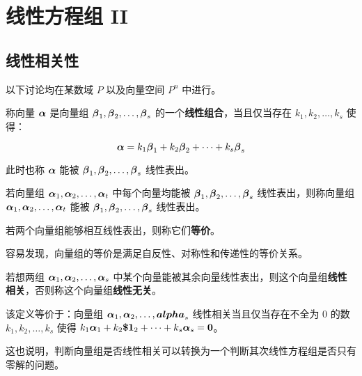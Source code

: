 \section{线性方程组 II}

\subsection{线性相关性}

以下讨论均在某数域 $P$ 以及向量空间	$P^n$ 中进行。

\begin{definition}
	称向量 $\boldsymbol{\alpha}$ 是向量组 $\boldsymbol{\beta}_1, \boldsymbol{\beta}_2, \dots, \boldsymbol{\beta}_s$ 的一个\textbf{线性组合}，当且仅当存在 $k_1, k_2, \dots, k_s$ 使得：

	$$
	\boldsymbol{\alpha} = k_1\boldsymbol{\beta}_1 + k_2\boldsymbol{\beta}_2 + \cdots + k_s\boldsymbol{\beta}_s
	$$

	此时也称 $\boldsymbol{\alpha}$ 能被 $\boldsymbol{\beta}_1, \boldsymbol{\beta}_2, \dots, \boldsymbol{\beta}_s$ 线性表出。
\end{definition}

\begin{definition}
	若向量组 $\boldsymbol{\alpha}_1, \boldsymbol{\alpha}_2, \dots, \boldsymbol{\alpha}_t$ 中每个向量均能被 $\boldsymbol{\beta}_1, \boldsymbol{\beta}_2, \dots, \boldsymbol{\beta}_s$ 线性表出，则称向量组 $\boldsymbol{\alpha}_1, \boldsymbol{\alpha}_2, \dots, \boldsymbol{\alpha}_t$ 能被 $\boldsymbol{\beta}_1, \boldsymbol{\beta}_2, \dots, \boldsymbol{\beta}_s$ 线性表出。

	若两个向量组能够相互线性表出，则称它们\textbf{等价}。
\end{definition}

容易发现，向量组的等价是满足自反性、对称性和传递性的等价关系。

\begin{definition}
	若想两组 $\boldsymbol{\alpha}_1, \boldsymbol{\alpha}_2, \dots, \boldsymbol{\alpha}_s$ 中某个向量能被其余向量线性表出，则这个向量组\textbf{线性相关}，否则称这个向量组\textbf{线性无关}。

	该定义等价于：向量组 $\boldsymbol{\alpha}_1, \boldsymbol{\alpha}_2, \dots, \boldsymbol{alpha}_s$ 线性相关当且仅当存在不全为 $0$ 的数 $k_1, k_2, \dots, k_s$ 使得 $k_1\boldsymbol{\alpha}_1 + k_2\boldsymbol{\$1}_2 + \cdots + k_s\boldsymbol{\alpha}_s = \boldsymbol{0}$。
\end{definition}

这也说明，判断向量组是否线性相关可以转换为一个判断其次线性方程组是否只有零解的问题。

